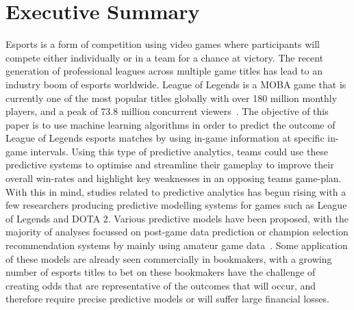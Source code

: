 
\chapter*{Executive Summary}\label{ch:executive summary}


Esports is a form of competition using video games where participants will compete either individually or in a team for a chance at victory.
The recent generation of professional leagues across multiple game titles has lead to an industry boom of esports worldwide.
League of Legends is a MOBA game that is currently one of the most popular titles globally with over 180 million monthly players, and a peak of 73.8 million concurrent viewers~\citep{riotplayercount, upcomerworld2021}.
The objective of this paper is to use machine learning algorithms in order to predict the outcome of League of Legends esports matches by using in-game information at specific in-game intervals.
Using this type of predictive analytics, teams could use these predictive systems to optimise and streamline their gameplay to improve their overall win-rates and highlight key weaknesses in an opposing teams game-plan.
With this in mind, studies related to predictive analytics has begun rising with a few researchers producing predictive modelling systems for games such as League of Legends and DOTA 2.
Various predictive models have been proposed, with the majority of analyses focussed on post-game data prediction or champion selection recommendation systems by mainly using amateur game data~\citep{ani2019victory, shen2022deep}.
Some application of these models are already seen commercially in bookmakers, with a growing number of esports titles to bet on these bookmakers have the challenge of creating odds that are representative of the outcomes that will occur, and therefore require precise predictive models or will suffer large financial losses. \\


